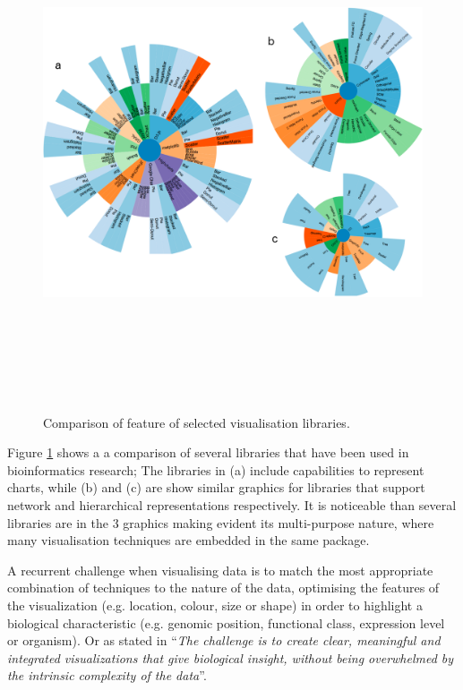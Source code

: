 \begin{figure}  
\includegraphics[height=6in,angle=90]{figures/vis_libs.png}
\caption[Comparison of feature of selected visualisation libraries.]{Comparison of feature of selected visualisation libraries.
\label{fig:vis_libs}}
\end{figure}

Figure \ref{fig:vis_libs} shows a a comparison of several libraries that have been used in bioinformatics research; The libraries in (a) include capabilities to represent charts, while (b) and (c) are show similar graphics for libraries that support network and hierarchical representations respectively. It is noticeable than several libraries are in the 3 graphics making evident its multi-purpose nature, where many visualisation techniques are embedded in the same package.

A recurrent challenge when visualising data is to match the most appropriate combination of techniques to the nature of the data, optimising the features of the visualization (e.g. location, colour, size or shape) in order to highlight a biological characteristic (e.g. genomic position, functional class, expression level or organism). Or as stated in \cite{GEH2010} ``\emph{The challenge is to create clear, meaningful and integrated visualizations that give biological insight, without being overwhelmed by the intrinsic complexity of the data}''.

